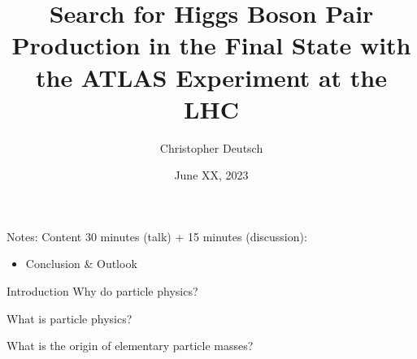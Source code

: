 \documentclass[11pt, xcolor={dvipsnames}, aspectratio=169]{beamer}
\author{Christopher Deutsch}
\institute{University of Bonn}
\date{June XX, 2023}
\title{\vspace{1.5em}Search for Higgs Boson Pair Production in the \bbtautau
  Final State with the ATLAS Experiment at the LHC}
\begin{document}
\maketitle

\begin{frame}[noframenumbering]{Notes: Content}
  30 minutes (talk) + 15 minutes (discussion):
  \begin{itemize}
  \item Conclusion \& Outlook
  \end{itemize}
\end{frame}


\begin{frame}{Introduction}
  Why do particle physics?

  What is particle physics?

  What is the origin of elementary particle masses?

\end{frame}

\end{document}
